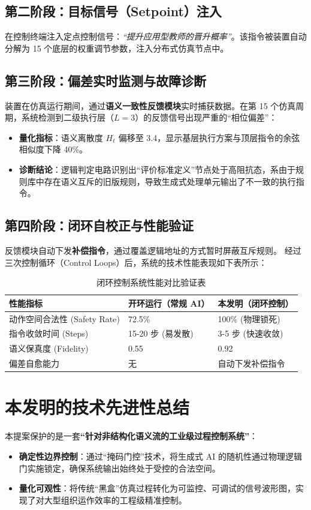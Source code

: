 \documentclass[UTF8, fontset=mac]{ctexart}
\begin{document}
\subsection{第二阶段：目标信号（Setpoint）注入}
在控制终端注入定点控制信号：\textit{“提升应用型教师的晋升概率”}。该指令被装置自动分解为 15 个底层的权重调节参数，注入分布式仿真节点中。

\subsection{第三阶段：偏差实时监测与故障诊断}
装置在仿真运行期间，通过\textbf{语义一致性反馈模块}实时捕获数据。在第 15 个仿真周期，系统检测到二级执行层（$L=3$）的反馈信号出现严重的“相位偏差”：
\begin{itemize}
    \item \textbf{量化指标}：语义离散度 $H_\ell$ 偏移至 3.4，显示基层执行方案与顶层指令的余弦相似度下降 40\%。
    \item \textbf{诊断结论}：逻辑判定电路识别出“评价标准定义”节点处于高阻抗态，系由于规则库中存在语义互斥的旧版规则，导致生成式处理单元输出了不一致的执行指令。
\end{itemize}

\subsection{第四阶段：闭环自校正与性能验证}
反馈模块自动下发\textbf{补偿指令}，通过覆盖逻辑地址的方式暂时屏蔽互斥规则。
经过三次控制循环（Control Loops）后，系统的技术性能表现如下表所示：

\begin{table}[h]
    \centering
    \caption{闭环控制系统性能对比验证表}
    \begin{tabular}{lll}
        \toprule
        \textbf{性能指标} & \textbf{开环运行（常规 AI）} & \textbf{本发明（闭环控制）} \\
        \midrule
        动作空间合法性 (Safety Rate) & 72.5\% & 100\% (物理锁死) \\
        指令收敛时间 (Steps) & 15-20 步 (易发散) & 3-5 步 (快速收敛) \\
        语义保真度 (Fidelity) & 0.55 & 0.92 \\
        偏差自愈能力 & 无 & 自动下发补偿指令 \\
        \bottomrule
    \end{tabular}
\end{table}

\section{本发明的技术先进性总结}
本提案保护的是一套\textbf{“针对非结构化语义流的工业级过程控制系统”}：
\begin{itemize}
    \item \textbf{确定性边界控制}：通过“掩码门控”技术，将生成式 AI 的随机性通过物理逻辑门实施锁定，确保系统输出始终处于受控的合法空间。
    \item \textbf{量化可观性}：将传统“黑盒”仿真过程转化为可监控、可调试的信号波形图，实现了对大型组织运作效率的工程级精准控制。
\end{itemize}
\end{document}

